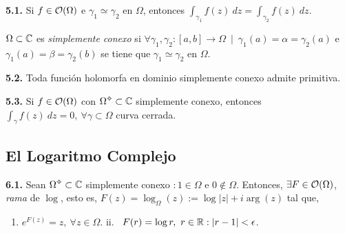 \begin{theorem}
    \textbf{5.1.} Si \(f \in \mathcal{O}(\Omega)\) e \(\gamma_1 \simeq \gamma_2 \) en \(\Omega\), entonces \(\displaystyle \int_{\gamma_1 } f(z) \ dz = \int_{\gamma_2} f(z) \ dz\). 
\end{theorem}

\begin{definition}
    \(\Omega \subset \mathbb{C}\) es \emph{simplemente conexo} si \(\forall \gamma_1, \gamma_2 : [a,b] \to \Omega \ \mid \ \gamma_1(a) = \alpha = \gamma_2(a) \)  e \(\gamma_1(a) = \beta = \gamma_2(b)\) se tiene que \(\gamma_1 \simeq \gamma_2\) en \(\Omega\). 
\end{definition}

\hypertarget{thm352}{}
\begin{theorem}
    \textbf{5.2.} Toda función holomorfa en dominio simplemente conexo admite primitiva. 
\end{theorem}


\begin{corollary}
    \textbf{5.3.} Si \(f \in \mathcal{O}(\Omega)\) con \(\Omega\ab\subset \C\) simplemente conexo, entonces \(\int_\gamma f(z) \ dz = 0, \ \forall \gamma \subset \Omega\) curva cerrada.   
\end{corollary}

\subsection*{El Logaritmo Complejo}

\begin{theorem}
    \textbf{6.1.} Sean \(\Omega\ab\subset \C\) simplemente conexo \(: 1 \in \Omega\) e \(0\notin \Omega \). Entonces, \(\exists F \in \mathcal{O}(\Omega)\), \emph{rama} de \(\log\), esto es, \(F(z) = \log_\Omega(z):= \log |z| + i \arg(z)\) tal que,    
    \vspace{-0.3cm}
    \begin{enumerate}[label = \roman*., left = 1cm]
        \item \(e^{F(z)} = z, \ \forall z \in \Omega\). \hfill ii. \ \(F(r) = \log r, \ r \in \mathbb{R} : |r-1| < \epsilon\).  \hspace{1cm} \-
    \end{enumerate}
\end{theorem}

